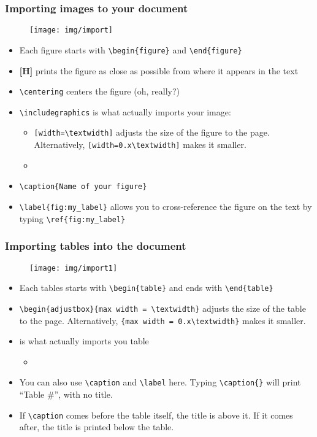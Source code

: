 \documentclass{beamer}
\begin{document}
\begin{frame}[fragile]
	\frametitle{Importing images to your document}
	\begin{figure}
		\texttt{[image: img/import]}
	\end{figure}
\begin{itemize}
	\tiny
	\item Each figure starts with \verb|\begin{figure}| and \verb|\end{figure}|
	\item \textbf{[H]} prints the figure as close as possible from where it appears in the text
	\item \verb|\centering| centers the figure (oh, really?)
	\item \verb|\includegraphics| is what actually imports your image:
	\begin{itemize}
		\tiny
		\item \verb|[width=\textwidth]| adjusts the size of the figure to the page. Alternatively, \verb|[width=0.x\textwidth]| makes it smaller.
		\item \color{red}{The path to your figure must begin from the same folder where your .tex file is!}
	\end{itemize}
	\item \verb|\caption{Name of your figure}|
	\item \verb|\label{fig:my_label}| allows you to cross-reference the figure on the text by typing \verb|\ref{fig:my_label}|
\end{itemize}
\end{frame}
\begin{frame}[fragile]
	\frametitle{Importing tables into the document}
	\begin{figure}
		\centering
		\texttt{[image: img/import1]}
	\end{figure}
	\begin{itemize}
		\tiny
		\item Each tables starts with \verb|\begin{table}| and ends with \verb|\end{table}|
		\item \verb|\begin{adjustbox}{max width = \textwidth}| adjusts the size of the table to the page. Alternatively, \verb|{max width = 0.x\textwidth}| makes it smaller.
		\item \verb|| is what actually imports you table
			\begin{itemize}
				\tiny
				\item \color{red}{The path to your figure must begin from the same folder where your .tex file is!}
			\end{itemize}
		\item You can also use \verb|\caption| and \verb|\label| here.  Typing \verb|\caption{}| will print “Table \#”, with no title.
		\item If \verb|\caption| comes before the table itself, the title is above it. If it comes after, the title is printed below the table.
	\end{itemize}
\end{frame}
\end{document}
